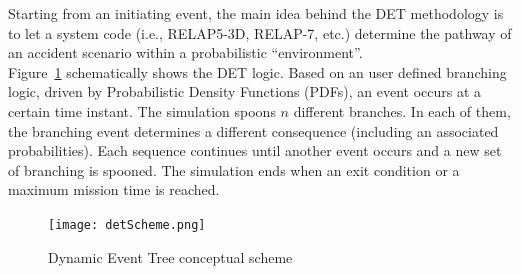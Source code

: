 \documentclass{anstrans}
\begin{document}
Starting from an initiating event, the main idea behind the DET methodology is to let a system code (i.e., RELAP5-3D, RELAP-7, etc.) determine the pathway of an accident scenario within a probabilistic ``environment''. \\ Figure~\ref{fig:detScheme} schematically shows the DET logic. Based on an user defined branching logic, driven by Probabilistic Density Functions (PDFs), an event occurs at a certain time instant. The simulation spoons $n$ different branches. In each of them, the branching event determines a different consequence (including an associated probabilities). Each sequence continues until another event occurs and a new set of branching is spooned. The simulation ends when an exit condition or a maximum mission time is reached.
\begin{figure} %
  \centering
  \texttt{[image: detScheme.png]}
  \caption{Dynamic Event Tree conceptual scheme}
  \label{fig:detScheme}
\end{figure}
\end{document}
